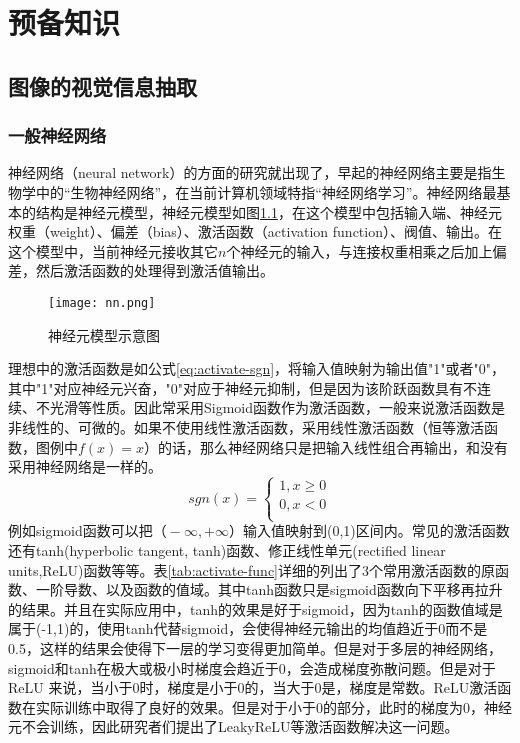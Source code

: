 
\chapter{预备知识}
\label{ch:pre}



\section{图像的视觉信息抽取}


\subsection{一般神经网络}
神经网络（neural network）的方面的研究就出现了，早起的神经网络主要是指生物学中的``生物神经网络''，在当前计算机领域特指``神经网络学习''。神经网络最基本的结构是神经元模型，神经元模型如图\ref{fig:nn-example}，在这个模型中包括输入端、神经元权重（weight）、偏差（bias）、激活函数（activation function）、阀值、输出。在这个模型中，当前神经元接收其它$n$个神经元的输入，与连接权重相乘之后加上偏差，然后激活函数的处理得到激活值输出。
\begin{figure}[htpb]
	\centering
	\texttt{[image: nn.png]}
    \caption{神经元模型示意图}
	\vspace*{-3.5mm}
	\label{fig:nn-example}
\end{figure}
理想中的激活函数是如公式\ref{eq:activate-sgn}，将输入值映射为输出值"1"或者"0"，其中"1"对应神经元兴奋，"0"对应于神经元抑制，但是因为该阶跃函数具有不连续、不光滑等性质。因此常采用Sigmoid函数作为激活函数，一般来说激活函数是非线性的、可微的。如果不使用线性激活函数，采用线性激活函数（恒等激活函数，图例中$f(x) = x$）的话，那么神经网络只是把输入线性组合再输出，和没有采用神经网络是一样的。
\begin{equation}\label{eq:activate-sgn}
    sgn(x)=\left\{
    \begin{aligned}
    1, x\geq 0 \\
    0, x<0 \\
    \end{aligned}
    \right.
\end{equation}
例如sigmoid函数可以把$（-\infty,+\infty）$输入值映射到(0,1)区间内。常见的激活函数还有tanh(hyperbolic tangent, tanh)函数、修正线性单元(rectified linear units,ReLU)函数等等。表\ref{tab:activate-func}详细的列出了3个常用激活函数的原函数、一阶导数、以及函数的值域。其中tanh函数只是sigmoid函数向下平移再拉升的结果。并且在实际应用中，tanh的效果是好于sigmoid，因为tanh的函数值域是属于(-1,1)的，使用tanh代替sigmoid，会使得神经元输出的均值趋近于0而不是0.5，这样的结果会使得下一层的学习变得更加简单。但是对于多层的神经网络，sigmoid和tanh在极大或极小时梯度会趋近于0，会造成梯度弥散问题。但是对于ReLU 来说，当小于0时，梯度是小于0的，当大于0是，梯度是常数。ReLU激活函数在实际训练中取得了良好的效果。但是对于小于0的部分，此时的梯度为0，神经元不会训练，因此研究者们提出了LeakyReLU等激活函数解决这一问题。
